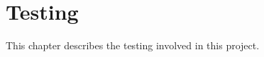\chapter{Testing}
\label{chapter:Testing}

This chapter describes the testing involved in this project.


